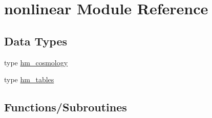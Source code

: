 \hypertarget{namespacenonlinear}{}\section{nonlinear Module Reference}
\label{namespacenonlinear}
\subsection*{Data Types}
\begin{DoxyCompactItemize}
\item 
type \mbox{\hyperlink{structnonlinear_1_1hm__cosmology}{hm\+\_\+cosmology}}
\item 
type \mbox{\hyperlink{structnonlinear_1_1hm__tables}{hm\+\_\+tables}}
\end{DoxyCompactItemize}
\subsection*{Functions/\+Subroutines}
